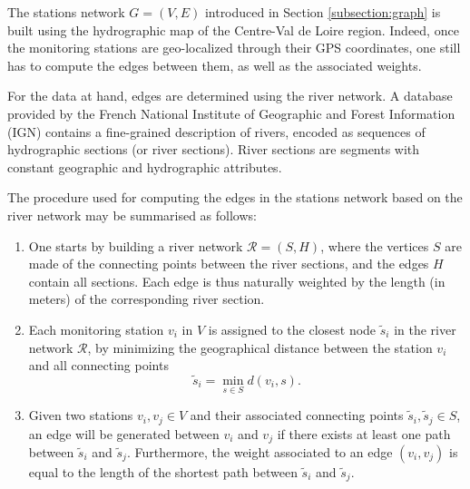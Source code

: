 The stations network $G=(V,E)$ introduced in Section \ref{subsection:graph} is built using the hydrographic map of the Centre-Val de Loire region. Indeed, once the monitoring stations are geo-localized through their GPS coordinates, one still has to compute the edges between them, as well as the associated weights. 

For the data at hand, edges are determined using the river network. A database provided by the French National Institute of Geographic and Forest Information (IGN) \cite{IGN:BD:TOPO} contains a fine-grained description of rivers, encoded as sequences of hydrographic sections (or river sections). River sections are segments with constant geographic and hydrographic attributes. 

The procedure used for computing the edges in the stations network based on the river network may be summarised as follows:



\begin{enumerate}
    \item One starts by building a river network $\mathcal{R}=(S,H)$, where the vertices $S$ are made of the connecting points between the river sections, and the edges $H$ contain all sections. Each edge is thus naturally weighted by the length (in meters) of the corresponding river section. 
    \item Each monitoring station $v_i$ in $V$ is assigned to the closest node $\tilde s_i$ in the river network $\mathcal{R}$, by minimizing the geographical distance between the station $v_i$ and all connecting points
    \begin{equation*}
     \tilde s_i=\min_{s\in S} d(v_i, s).
    \end{equation*}
    \item Given two stations $v_i,v_j \in V$ and their associated connecting points $\tilde s_i,\tilde s_j \in S$, an edge will be generated between $v_i$ and $v_j$ if there exists at least one path between $\tilde s_i$ and $\tilde s_j$. Furthermore, the weight associated to an edge $(v_i,v_j)$ is equal to the length of the shortest path between $\tilde s_i$ and $\tilde s_j$.
\end{enumerate}

